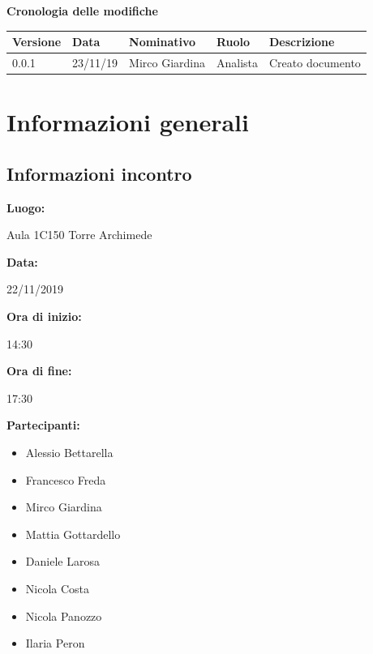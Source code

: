 \documentclass{article}
\begin{document}
    \vspace*{0.3cm}
    {\Large\bfseries Cronologia delle modifiche}
    \newline\newline
    \setlength{\tabcolsep}{18pt}
    \renewcommand{\arraystretch}{1.5}
    { \normalsize\mdseries
        \begin{tabular}{ |p{} p{1cm} p{} p{2cm} p{3cm}| } 
            \hline
            \rowcolor{custom}
            \bfseries\leavevmode\color{white} Versione & \bfseries\leavevmode\color{white} Data & \bfseries\leavevmode\color{white} Nominativo & \bfseries\leavevmode\color{white} Ruolo & \bfseries\leavevmode\color{white} Descrizione \\
            \hline\hline
            0.0.1 & 23/11/19 & Mirco Giardina & Analista & Creato documento \\ 
            \hline
        \end{tabular}
    }
    
    \clearpage
    \renewcommand*\contentsname{Indice}
    \tableofcontents
    
    \newpage
    \section{Informazioni generali}
    \subsection{Informazioni incontro}
    \begin{itemize}
        {\item\bfseries Luogo:}  Aula 1C150 Torre Archimede
        {\item\bfseries Data:} 22/11/2019
        {\item\bfseries Ora di inizio:} 14:30
        {\item\bfseries Ora di fine:} 17:30
        {\item\bfseries Partecipanti:}
            \begin{itemize}
                \item Alessio Bettarella
                \item Francesco Freda
                \item Mirco Giardina
                \item Mattia Gottardello
                \item Daniele Larosa
                \item Nicola Costa
                \item Nicola Panozzo
                \item Ilaria Peron
            \end{itemize}
    \end{itemize}
\end{document}
